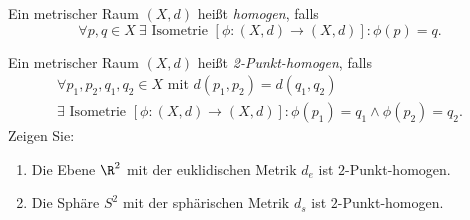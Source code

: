 \begin{assignment}
  Ein metrischer Raum \( (X,d) \) heißt \emph{homogen}, falls
  \begin{equation*}
    \forall p,q \in X \ \exists \text{ Isometrie } [\phi: (X,d) \to (X,d)] : \phi(p) = q\text{.}
  \end{equation*}
  
  Ein metrischer Raum \( (X,d) \) heißt \emph{2-Punkt-homogen}, falls
  \begin{multline*}
    \forall p_1,p_2,q_1,q_2 \in X \text{ mit } d(p_1,p_2) = d(q_1,q_2) \\
    \exists \text{ Isometrie } [\phi: (X,d) \to (X,d)] : \phi(p_1) = q_1 \wedge \phi(p_2) = q_2\text{.}
  \end{multline*}
  Zeigen Sie:
  \begin{enumerate}[label= (\alph*)]
    \item Die Ebene \( \R^2 \) mit der euklidischen Metrik \( d_e \) ist \( 2 \)-Punkt-homogen.
    \item Die Sphäre \( S^2 \) mit der sphärischen Metrik \( d_s \) ist \( 2 \)-Punkt-homogen.
  \end{enumerate}
\end{assignment}
